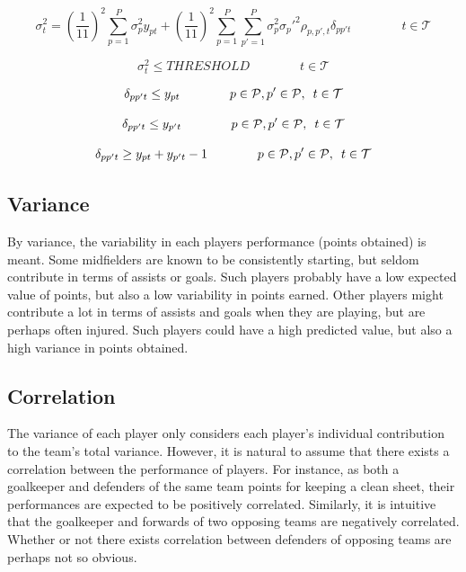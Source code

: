\begin{equation}
    \sigma^2_{t} = (\frac{1}{11})^2\sum_{p = 1}^{P}\sigma_p^2 y_{pt} + (\frac{1}{11})^2\sum_{p = 1}^{P}\sum_{p' = 1}^{P} \sigma_p^2\sigma_p'^2\rho_{p,p',t} \delta_{pp't} \qquad\qquad t \in \mathcal{T}
\end{equation}

\begin{equation}
    \sigma^2_{t} \leq THRESHOLD \qquad\qquad t \in \mathcal{T}
\end{equation}

\begin{equation}
    \delta_{pp't} \leq y_{pt}  \qquad\qquad p \in \mathcal{P}, p' \in \mathcal{P}, \enskip t \in \mathcal{T}
\end{equation}

\begin{equation}
    \delta_{pp't} \leq y_{p't}  \qquad\qquad p \in \mathcal{P}, p' \in \mathcal{P}, \enskip t \in \mathcal{T}
\end{equation}

\begin{equation}
    \delta_{pp't} \geq y_{pt} + y_{p't} - 1  \qquad\qquad p \in \mathcal{P}, p' \in \mathcal{P}, \enskip t \in \mathcal{T}
\end{equation}



\subsection{Variance}
By variance, the variability in each players performance (points obtained) is meant. Some midfielders are known to be consistently starting, but seldom contribute in terms of assists or goals. Such players probably have a low expected value of points, but also a low variability in points earned. Other players might contribute a lot in terms of assists and goals when they are playing, but are perhaps often injured. Such players could have a high predicted value, but also a high variance in points obtained.\newpar

\subsection{Correlation}
The variance of each player only considers each player's individual contribution to the team's total variance. However, it is natural to assume that there exists a correlation between the performance of players. For instance, as both a goalkeeper and defenders of the same team points for keeping a clean sheet, their performances are expected to be positively correlated. Similarly, it is intuitive that the goalkeeper and forwards of two opposing teams are negatively correlated. Whether or not there exists correlation between defenders of opposing teams are perhaps not so obvious. \newpar


